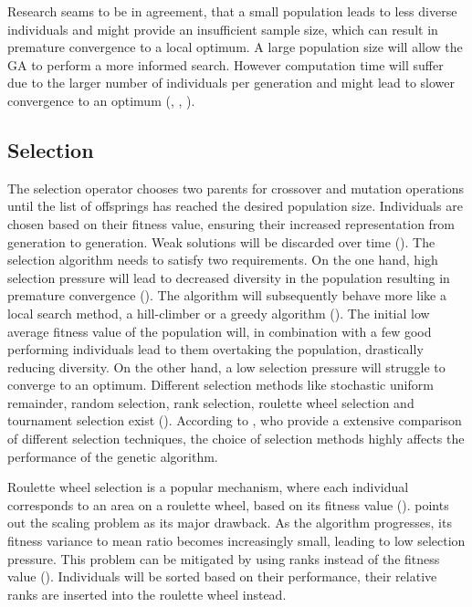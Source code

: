 Research seams to be in agreement, that a small population leads to less diverse individuals and might provide an insufficient sample size, which can result in premature convergence to a local optimum.
A large population size will allow the GA to perform a more informed search. However computation time will suffer due to the larger number of individuals per generation and might lead to slower convergence to an optimum (\cite{grefenstette_optimization_1986}, \cite{katoch_review_2021}, \cite{kacprzyk_parameter_2007}).

\subsection{Selection}
The selection operator chooses two parents for crossover and mutation operations until the list of offsprings has reached the desired population size. Individuals are chosen based on their fitness value, ensuring their increased representation from generation to generation. Weak solutions will be discarded over time (\cite{srinivas_genetic_1994}). The selection algorithm needs to satisfy two requirements. On the one hand, high selection pressure will lead to decreased diversity in the population resulting in premature convergence (\cite{katoch_review_2021}). The algorithm will subsequently behave more like a local search method, a hill-climber or a greedy algorithm (\cite{kacprzyk_parameter_2007}). The initial low average fitness value of the population will, in combination with a few good performing individuals lead to them overtaking the population, drastically reducing diversity. On the other hand, a low selection pressure will struggle to converge to an optimum. Different selection methods like stochastic uniform remainder, random selection, rank selection, roulette wheel selection and tournament selection exist (\cite{majumdar_genetic_2015}). According to \cite{hussain_trade-off_2020}, who provide a extensive comparison of different selection techniques, the choice of selection methods highly affects the performance of the genetic algorithm.

Roulette wheel selection is a popular mechanism, where each individual corresponds to an area on a roulette wheel, based on its fitness value (\cite{holland_adaptation_1992}). \cite{grefenstette_optimization_1986} points out the scaling problem as its major drawback. As the algorithm progresses, its fitness variance to mean ratio becomes increasingly small, leading to low selection pressure.
This problem can be mitigated by using ranks instead of the fitness value (\cite{katoch_review_2021}). Individuals will be sorted based on their performance, their relative ranks are inserted into the roulette wheel instead. 


